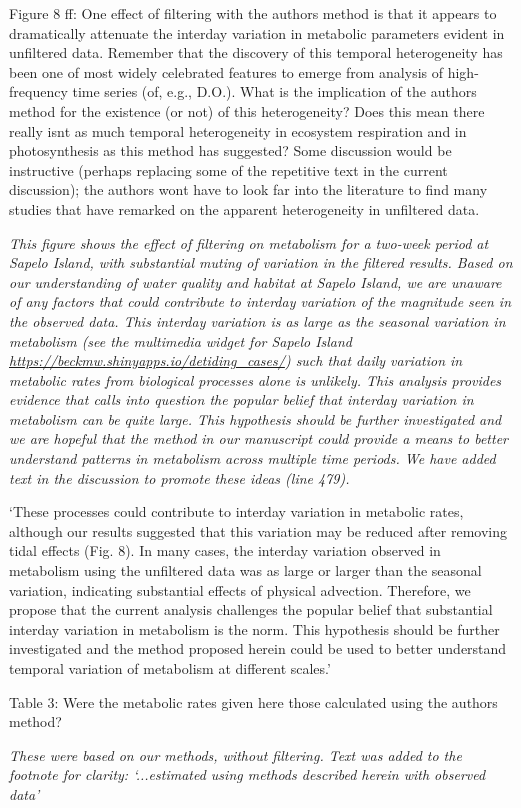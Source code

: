 \documentclass[letterpaper,12pt]{article}\usepackage[]{graphicx}\usepackage[]{color}
\begin{document}
Figure 8 ff: One effect of filtering with the authors method is that it appears to dramatically attenuate the interday variation in metabolic parameters evident in unfiltered data. Remember that the discovery of this temporal heterogeneity has been one of most widely celebrated features to emerge from analysis of high-frequency time series (of, e.g., D.O.). What is the implication of the authors method for the existence (or not) of this heterogeneity? Does this mean there really isnt as much temporal heterogeneity in ecosystem respiration and in photosynthesis as this method has suggested? Some discussion would be instructive (perhaps
replacing some of the repetitive text in the current discussion); the authors wont have to look far into the literature to find many studies that have remarked on the apparent heterogeneity in unfiltered data.

{\it This figure shows the effect of filtering on metabolism for a two-week period at Sapelo Island, with substantial muting of variation in the filtered results.  Based on our understanding of water quality and habitat at Sapelo Island, we are unaware of any factors that could contribute to interday variation of the magnitude seen in the observed data.  This interday variation is as large as the seasonal variation in metabolism (see the multimedia widget for Sapelo Island  \href{https://beckmw.shinyapps.io/detiding_cases/}{https://beckmw.shinyapps.io/detiding\_cases/}) such that daily variation in metabolic rates from biological processes alone is unlikely.  This analysis provides evidence that calls into question the popular belief that interday variation in metabolism can be quite large.  This hypothesis should be further investigated and we are hopeful that the method in our manuscript could provide a means to better understand patterns in metabolism across multiple time periods.  We have added text in the discussion to promote these ideas (line 479).    

`These processes could contribute to interday variation in metabolic rates, although our results suggested that this variation may be reduced after removing tidal effects (Fig. 8).  In many cases, the interday variation observed in metabolism using the unfiltered data was as large or larger than the seasonal variation, indicating substantial effects of physical advection.  Therefore, we propose that the current analysis challenges the popular belief that substantial interday variation in metabolism is the norm.  This hypothesis should be further investigated and the method proposed herein could be used to better understand temporal variation of metabolism at different scales.'}

Table 3: Were the metabolic rates given here those calculated using the authors method?

{\it These were based on our methods, without filtering.  Text was added to the footnote for clarity: `...estimated using methods described herein with observed data'}
\end{document}
